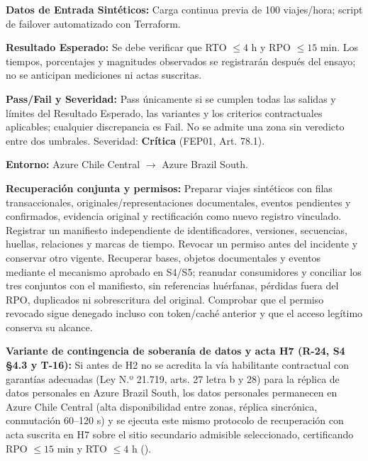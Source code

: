 \par\noindent \textbf{Datos de Entrada Sintéticos:} Carga continua previa de 100 viajes/hora; script de failover automatizado con Terraform.\par
\par\noindent \textbf{Resultado Esperado:} Se debe verificar que RTO $\le 4\text{ h}$ y RPO $\le 15\text{ min}$. Los tiempos, porcentajes y magnitudes observados se registrarán después del ensayo; no se anticipan mediciones ni actas suscritas.\par
\par\noindent \textbf{Pass/Fail y Severidad:} Pass únicamente si se cumplen todas las salidas y límites del Resultado Esperado, las variantes y los criterios contractuales aplicables; cualquier discrepancia es Fail. No se admite una zona sin veredicto entre dos umbrales. Severidad: \textbf{Crítica} (FEP01, Art. 78.1).\par
\par\noindent \textbf{Entorno:} Azure Chile Central $\rightarrow$ Azure Brazil South.\par



\par\noindent\textbf{Recuperación conjunta y permisos:} Preparar viajes sintéticos con filas transaccionales, originales/representaciones documentales, eventos pendientes y confirmados, evidencia original y rectificación como nuevo registro vinculado. Registrar un manifiesto independiente de identificadores, versiones, secuencias, huellas, relaciones y marcas de tiempo. Revocar un permiso antes del incidente y conservar otro vigente. Recuperar bases, objetos documentales y eventos mediante el mecanismo aprobado en S4/S5; reanudar consumidores y conciliar los tres conjuntos con el manifiesto, sin referencias huérfanas, pérdidas fuera del RPO, duplicados ni sobrescritura del original. Comprobar que el permiso revocado sigue denegado incluso con token/caché anterior y que el acceso legítimo conserva su alcance.\par

\par\noindent\textbf{Variante de contingencia de soberanía de datos y acta H7 (R-24, S4 §4.3 y T-16):} Si antes de H2 no se acredita la vía habilitante contractual con garantías adecuadas (Ley N.º 21.719, arts. 27 letra b y 28) para la réplica de datos personales en Azure Brazil South, los datos personales permanecen en Azure Chile Central (alta disponibilidad entre zonas, réplica sincrónica, conmutación 60--120 s) y se ejecuta este mismo protocolo de recuperación con acta suscrita en H7 sobre el sitio secundario admisible seleccionado, certificando RPO $\le 15\text{ min}$ y RTO $\le 4\text{ h}$ ().\par

